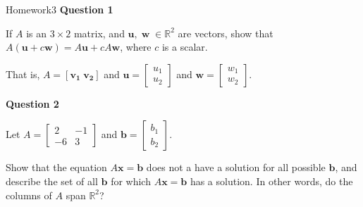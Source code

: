 \documentclass[10pt, aspectratio=169]{beamer}
\begin{document}
\begin{frame}{Homework3}
\textbf{Question 1}

If \(A\) is an \(3\times 2\) matrix, and \(\mathbf{u}, \;\mathbf{w} \; \in \mathbb{R}^2\) are vectors, show that \(A(\mathbf{u} + c\mathbf{w}) = A\mathbf{u} + cA\mathbf{w}\), where \(c\) is a scalar.

    That is, \(A = [\mathbf{v_1} \; \mathbf{v_2} ]\) and 
    \( \mathbf{u} = 
   \begin{bmatrix}
       u_1\\
       u_2
   \end{bmatrix} \)
   and 
   \( \mathbf{w} = 
   \begin{bmatrix}
       w_1\\
       w_2
   \end{bmatrix} \).


\textbf{Question 2}

Let \(A= 
           \begin{bmatrix}
               2 & -1\\
              -6 &  3 
            \end{bmatrix} \)
and \( \mathbf{b}=
        \begin{bmatrix}
               b_1\\
               b_2
           \end{bmatrix}.
        \)
        
Show that the equation \(A\mathbf{x} = \mathbf{b} \) does not a have a solution for all possible \(\mathbf{b}\), and describe the set of all \(\mathbf{b}\) for which \(A\mathbf{x} = \mathbf{b} \) has a solution.
In other words, do the columns of \(A\) span \(\mathbb{R}^2\)?
\end{frame}
\end{document}
